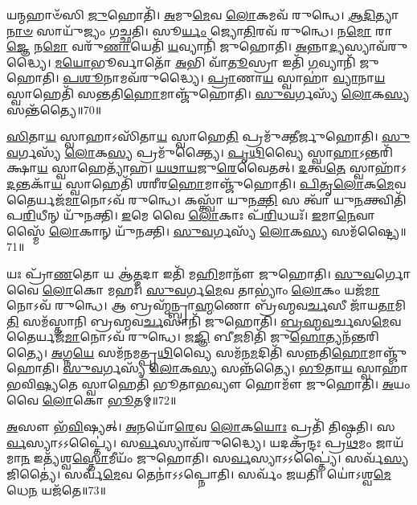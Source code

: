 𑌯𑌨𑍍𑌮𑌹𑌾𑍞᳴𑌸𑌿 \ul{𑌜𑍁}\-𑌹𑍋𑌤𑌿᳴।
\-\ul{𑌅}\-𑌮𑍁\-\ul{𑌮𑍇}\-𑌵 \ul{𑌲𑍋}\-𑌕𑌮𑌵᳴ 𑌰𑍁𑌨𑍍𑌧𑍇।
\-\ul{𑌆}\-\-\ul{𑌦𑌿}\-𑌤𑍍𑌯𑌾\-\ul{𑌨𑌾}\-\-\ul{𑍞} 𑌸𑌾𑌯𑍁᳴𑌜𑍍𑌯𑌂 𑌗𑌚𑍍𑌛𑌤𑌿।
𑌸𑍂\-\ul{𑌰𑍍𑌯𑌂} 𑌜𑍍𑌯𑍋\-\ul{𑌤𑌿}\-𑌰𑌵᳴ 𑌰𑍁𑌨𑍍𑌧𑍇।
𑌨\-\ul{𑌮𑍋} 𑌰𑌾\-\ul{𑌜𑍍𑌞𑍇} 𑌨\-\ul{𑌮𑍋} 𑌵𑌰𑍁᳴\-\ul{𑌣𑌾}\-𑌯𑍇𑌤𑌿᳴ \ul{𑌯}\-𑌵𑍍𑌯𑌾𑌨𑌿᳴ 𑌜𑍁𑌹𑍋𑌤𑌿।
\-\ul{𑌅}\-𑌨𑍍𑌨𑌾\-\ul{𑌦𑍍𑌯}\-𑌸𑍍𑌯𑌾𑌵᳴𑌰𑍁𑌦𑍍𑌧𑍍𑌯𑍈।
\-\ul{𑌮}\-\-\ul{𑌯𑍋}\-𑌭𑍂𑌰𑍍𑌵𑌾𑌤𑍋᳴ \ul{𑌅}\-𑌭𑌿 𑌵𑌾᳴\-\ul{𑌤𑍂}\-𑌸𑍍𑌰𑌾 𑌇𑌤𑌿᳴ \ul{𑌗}\-𑌵𑍍𑌯𑌾𑌨𑌿᳴ 𑌜𑍁𑌹𑍋𑌤𑌿।
\-\ul{𑌪}\-\-\ul{𑌶𑍂}\-𑌨𑌾𑌮𑌵᳴𑌰𑍁𑌦𑍍𑌧𑍍𑌯𑍈।
\-\ul{𑌪𑍍𑌰𑌾}\-𑌣𑌾\-\ul{𑌯} 𑌸𑍍𑌵𑌾𑌹𑌾॑ \ul{𑌵𑍍𑌯𑌾}\-𑌨𑌾\-\ul{𑌯} 𑌸𑍍𑌵𑌾𑌹𑍇𑌤𑌿᳴ 𑌸𑌨𑍍𑌤𑌤𑌿\-\ul{𑌹𑍋}\-𑌮𑌾𑌞𑍍𑌜𑍁᳴𑌹𑍋𑌤𑌿।
\-\ul{𑌸𑍁}\-\-\ul{𑌵}\-𑌰𑍍𑌗𑌸𑍍𑌯᳴ \ul{𑌲𑍋}\-𑌕\-\ul{𑌸𑍍𑌯} 𑌸𑌨𑍍𑌤᳴𑌤𑍍𑌯𑍈॥70॥

\-\ul{𑌸𑌿}\-𑌤𑌾\-\ul{𑌯} 𑌸𑍍𑌵𑌾𑌹𑌾\-𑌽𑌸𑌿᳴𑌤𑌾\-\ul{𑌯} 𑌸𑍍𑌵𑌾𑌹𑍇\-\ul{𑌤𑌿} 𑌪𑍍𑌰𑌮𑍁᳴𑌕𑍍𑌤𑍀𑌰𑍍𑌜𑍁𑌹𑍋𑌤𑌿।
\-\ul{𑌸𑍁}\-\-\ul{𑌵}\-𑌰𑍍𑌗𑌸𑍍𑌯᳴ \ul{𑌲𑍋}\-𑌕\-\ul{𑌸𑍍𑌯} 𑌪𑍍𑌰𑌮𑍁᳴𑌕𑍍𑌤𑍍𑌯𑍈।
\-\ul{𑌪𑍃}\-\-\ul{𑌥𑌿}\-𑌵𑍍𑌯𑍈 𑌸𑍍𑌵𑌾\-\ul{𑌹𑌾}\-\-𑌽𑌨𑍍𑌤𑌰𑌿᳴𑌕𑍍𑌷𑌾\-\ul{𑌯} 𑌸𑍍𑌵𑌾𑌹𑍇𑌤𑍍𑌯𑌾᳴𑌹।
\-\ul{𑌯}\-\-\ul{𑌥𑌾}\-\-\ul{𑌯}\-𑌜𑍁\-\ul{𑌰𑍇}\-𑌵𑍈𑌤𑌤𑍍।
\-\ul{𑌦}\-𑌤𑍍𑌵\-\ul{𑌤𑍇} 𑌸𑍍𑌵𑌾𑌹𑌾᳴\-𑌽\-\ul{𑌦}\-𑌨𑍍𑌤𑌕𑌾᳴\-\ul{𑌯} 𑌸𑍍𑌵𑌾𑌹𑍇𑌤𑌿᳴ 𑌶𑌰𑍀𑌰\-\ul{𑌹𑍋}\-𑌮𑌾𑌞𑍍𑌜𑍁᳴𑌹𑍋𑌤𑌿।
\-\ul{𑌪𑌿}\-\-\ul{𑌤𑍃}\-\-\ul{𑌲𑍋}\-𑌕\-\ul{𑌮𑍇}\-𑌵 𑌤𑍈𑌰𑍍𑌯𑌜᳴\-\ul{𑌮𑌾}\-𑌨𑍋𑌽𑌵᳴ 𑌰𑍁𑌨𑍍𑌧𑍇।
𑌕𑌸𑍍𑌤𑍍𑌵𑌾᳴ 𑌯𑍁𑌨\-\ul{𑌕𑍍𑌤𑌿} 𑌸 𑌤𑍍𑌵𑌾᳴ 𑌯𑍁\-\ul{𑌨}\-𑌕𑍍𑌤𑍍𑌵𑌿𑌤𑌿᳴ 𑌪\-\ul{𑌰𑌿}\-𑌧𑍀𑌨𑍍 𑌯𑍁᳴𑌨𑌕𑍍𑌤𑌿।
\-\ul{𑌇}\-𑌮𑍇 𑌵𑍈 \ul{𑌲𑍋}\-𑌕𑌾𑌃 𑌪᳴\-\ul{𑌰𑌿}\-𑌧𑌯𑌃᳴।
\-\ul{𑌇}\-𑌮𑌾\-\ul{𑌨𑍇}\-𑌵𑌾𑌸𑍍𑌮𑍈᳴ \ul{𑌲𑍋}\-𑌕𑌾𑌨𑍍 𑌯𑍁᳴𑌨𑌕𑍍𑌤𑌿।
\-\ul{𑌸𑍁}\-\-\ul{𑌵}\-𑌰𑍍𑌗𑌸𑍍𑌯᳴ \ul{𑌲𑍋}\-𑌕\-\ul{𑌸𑍍𑌯} 𑌸𑌮᳴𑌷𑍍𑌟𑍍𑌯𑍈॥71॥

𑌯𑌃 𑌪𑍍𑌰𑌾᳴\-\ul{𑌣}\-𑌤𑍋 𑌯 𑌆॑\-\ul{𑌤𑍍𑌮}\-𑌦𑌾 𑌇𑌤𑌿᳴ 𑌮\-\ul{𑌹𑌿}\-𑌮𑌾𑌨𑍗᳴ 𑌜𑍁𑌹𑍋𑌤𑌿।
\-\ul{𑌸𑍁}\-\-\ul{𑌵}\-𑌰𑍍𑌗𑍋 𑌵𑍈 \ul{𑌲𑍋}\-𑌕𑍋 𑌮𑌹𑌃᳴।
\-\ul{𑌸𑍁}\-\-\ul{𑌵}\-𑌰𑍍𑌗\-\ul{𑌮𑍇}\-𑌵 𑌤𑌾𑌭𑍍𑌯𑌾𑌂॑ \ul{𑌲𑍋}\-𑌕𑌂 𑌯𑌜᳴\-\ul{𑌮𑌾}\-𑌨𑍋𑌽𑌵᳴ 𑌰𑍁𑌨𑍍𑌧𑍇।
𑌆 𑌬𑍍𑌰𑌹𑍍𑌮᳴𑌨𑍍𑌬𑍍𑌰𑌾\-\ul{𑌹𑍍𑌮}\-𑌣𑍋 𑌬𑍍𑌰᳴𑌹𑍍𑌮𑌵\-\ul{𑌰𑍍𑌚}\-𑌸𑍀 𑌜𑌾᳴𑌯\-\ul{𑌤𑌾}\-𑌮𑌿\-\ul{𑌤𑌿} 𑌸𑌮᳴𑌸𑍍𑌤𑌾𑌨𑌿 𑌬𑍍𑌰𑌹𑍍𑌮𑌵\-\ul{𑌰𑍍𑌚}\-𑌸𑌾𑌨𑌿᳴ 𑌜𑍁𑌹𑍋𑌤𑌿।
\-\ul{𑌬𑍍𑌰}\-\-\ul{𑌹𑍍𑌮}\-\-\ul{𑌵}\-𑌰𑍍𑌚𑌸\-\ul{𑌮𑍇}\-𑌵 𑌤𑍈𑌰𑍍𑌯𑌜᳴\-\ul{𑌮𑌾}\-𑌨𑍋𑌽𑌵᳴ 𑌰𑍁𑌨𑍍𑌧𑍇।
𑌜\-\ul{𑌜𑍍𑌞𑌿} 𑌬𑍀\-\ul{𑌜}\-𑌮𑌿𑌤𑌿᳴ 𑌜𑍁\-\ul{𑌹𑍋}\-𑌤𑍍𑌯𑌨᳴𑌨𑍍𑌤𑌰𑌿𑌤𑍍𑌯𑍈।
\-\ul{𑌅}\-𑌗𑍍𑌨\-\ul{𑌯𑍇} 𑌸𑌮᳴𑌨𑌮𑌤𑍍𑌪𑍃\-\ul{𑌥𑌿}\-𑌵𑍍𑌯𑍈 𑌸𑌮᳴𑌨\-\ul{𑌮}\-𑌦𑌿𑌤𑌿᳴ 𑌸𑌨𑍍𑌨𑌤𑌿\-\ul{𑌹𑍋}\-𑌮𑌾𑌞𑍍𑌜𑍁᳴𑌹𑍋𑌤𑌿।
\-\ul{𑌸𑍁}\-\-\ul{𑌵}\-𑌰𑍍𑌗𑌸𑍍𑌯᳴ \ul{𑌲𑍋}\-𑌕\-\ul{𑌸𑍍𑌯} 𑌸𑌨𑍍𑌨᳴𑌤𑍍𑌯𑍈।
\-\ul{𑌭𑍂}\-𑌤𑌾\-\ul{𑌯} 𑌸𑍍𑌵𑌾𑌹𑌾᳴ 𑌭𑌵𑌿\-\ul{𑌷𑍍𑌯}\-𑌤𑍇 𑌸𑍍𑌵𑌾𑌹𑍇𑌤𑌿᳴ 𑌭𑍂𑌤𑌾\-\ul{𑌭}\-𑌵𑍍𑌯𑍗 𑌹𑍋𑌮𑍗᳴ 𑌜𑍁𑌹𑍋𑌤𑌿।
\-\ul{𑌅}\-𑌯𑌂 𑌵𑍈 \ul{𑌲𑍋}\-𑌕𑍋 \ul{𑌭𑍂}\-𑌤𑌮𑍍॥72॥

\-\ul{𑌅}\-𑌸𑍗 𑌭᳴\-\ul{𑌵𑌿}\-𑌷𑍍𑌯𑌤𑍍।
\-\ul{𑌅}\-𑌨𑌯𑍋᳴\-\ul{𑌰𑍇}\-𑌵 \ul{𑌲𑍋}\-𑌕\-\ul{𑌯𑍋𑌃} 𑌪𑍍𑌰𑌤𑌿᳴ 𑌤𑌿𑌷𑍍𑌠𑌤𑌿।
𑌸\-\ul{𑌰𑍍𑌵}\-𑌸𑍍𑌯𑌾𑌽𑌽𑌪𑍍𑌤𑍍𑌯𑍈॑।
𑌸\-\ul{𑌰𑍍𑌵}\-𑌸𑍍𑌯𑌾𑌵᳴𑌰𑍁𑌦𑍍𑌧𑍍𑌯𑍈।
𑌯𑌦𑌕𑍍𑌰᳴𑌨𑍍𑌦𑌃 𑌪𑍍𑌰\-\ul{𑌥}\-𑌮𑌂 𑌜𑌾𑌯᳴𑌮𑌾\-\ul{𑌨} 𑌇𑌤𑍍𑌯᳴𑌶𑍍𑌵\-\ul{𑌸𑍍𑌤𑍋}\-𑌮𑍀𑌯𑌂᳴ 𑌜𑍁𑌹𑍋𑌤𑌿।
𑌸\-\ul{𑌰𑍍𑌵}\-𑌸𑍍𑌯𑌾𑌽𑌽𑌪𑍍𑌤𑍍𑌯𑍈॑।
𑌸𑌰𑍍𑌵᳴\-\ul{𑌸𑍍𑌯} 𑌜𑌿𑌤𑍍𑌯𑍈॑।
𑌸𑌰𑍍𑌵᳴\-\ul{𑌮𑍇}\-𑌵 𑌤𑍇𑌨𑌾॑𑌽𑌽𑌪𑍍𑌨𑍋𑌤𑌿।
𑌸𑌰𑍍𑌵𑌂᳴ 𑌜𑌯𑌤𑌿।
𑌯𑍋॑𑌽𑌶𑍍𑌵\-\ul{𑌮𑍇}\-𑌧𑍇\-\ul{𑌨} 𑌯𑌜᳴𑌤𑍇॥73॥

